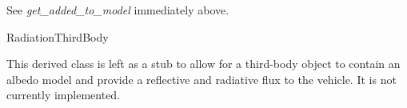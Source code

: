 {\begin{enumerate}
{\begin{enumerate}
See \textit{get\_added\_to\_model} immediately above.

\end{enumerate}}

 RadiationThirdBody

This derived class is left as a stub to allow for a third-body object to
contain an albedo model and provide a reflective and radiative flux to the
vehicle.  It is not currently implemented.

\end{enumerate}}
